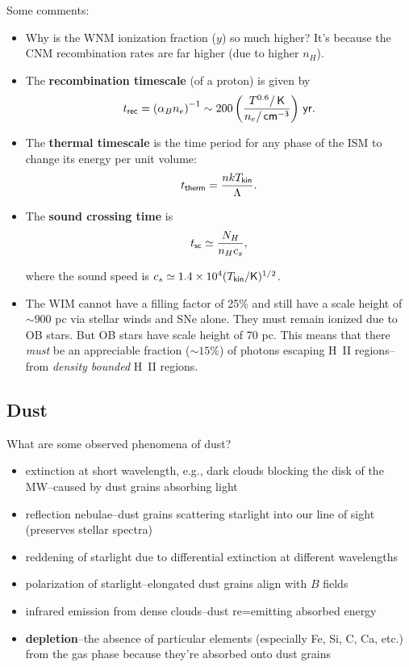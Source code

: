 \documentclass{tufte-handout}
\renewcommand{\textbf}[1]{{\bf \textcolor{dark-gray}{#1}}}
\renewcommand{\rm}{\sf}
\newcommand{\HII}{\textnormal{H{\smaller~\textsc{II}}}}
\newcommand{\e}[1]{\times 10^{#1}}
\begin{document}
Some comments:
\begin{itemize}

\item Why is the WNM ionization fraction ($y$) so much higher? It's because the CNM recombination rates are far higher (due to higher $n_H$). 

\item The \textbf{recombination timescale} (of a proton) is given by
\begin{equation}
t_{\rm rec} = \left (\alpha_B n_e\right )^{-1} \sim 200 \left (\frac{T^{0.6}/{\rm\, K}}{n_e/{\rm\, cm^{-3}}}\right ) {\rm\, yr}.
\end{equation}

\item The \textbf{thermal timescale} is the time period for any phase of the ISM to change its energy per unit volume:
\begin{equation}
t_{\rm therm} = \frac{nkT_{\rm kin}}{\Lambda}.
\end{equation}

\item The \textbf{sound crossing time} is
\begin{equation}
t_{\rm sc} \simeq \frac{N_H}{n_H c_s},
\end{equation}

where the sound speed is $c_s \simeq 1.4\e{4} (T_{\rm kin}/{\rm K})^{1/2}$.

\item The WIM cannot have a filling factor of 25\% and still have a scale height of $\sim 900$ pc via stellar winds and SNe alone. They must remain ionized due to OB stars. But OB stars have scale height of 70 pc. This means that there \textit{must} be an appreciable fraction ($\sim 15\%$) of photons escaping \HII{} regions--from \textit{density bounded} \HII{} regions.
\end{itemize}

\subsection{Dust}

What are some observed phenomena of dust?
\begin{itemize}
\item extinction at short wavelength, e.g., dark clouds blocking the disk of the MW--caused by dust grains absorbing light
\item reflection nebulae--dust grains scattering starlight into our line of sight (preserves stellar spectra)
\item reddening of starlight due to differential extinction at different wavelengths
\item polarization of starlight--elongated dust grains align with $B$ fields
\item infrared emission from dense clouds--dust re=emitting absorbed energy
\item \textbf{depletion}--the absence of particular elements (especially Fe, Si, C, Ca, etc.) from the gas phase because they're absorbed onto dust grains
\end{itemize}
\end{document}
